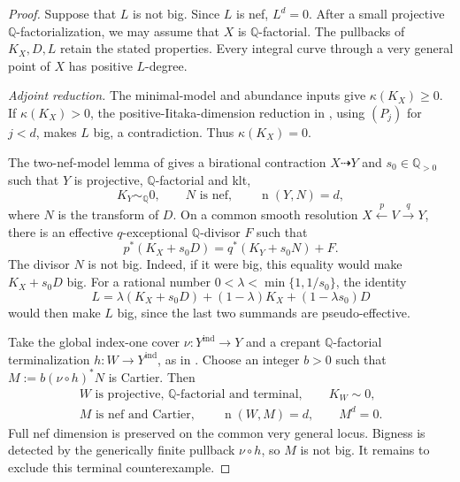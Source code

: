 \documentclass[12pt,a4paper,psamsfonts]{amsart}
\theoremstyle{definition}
\theoremstyle{plain}
\newcommand{\Q}{\mathbb Q}
\newcommand{\nef}{\operatorname{n}}
\begin{document}
\begin{proof}
Suppose that $L$ is not big. Since $L$ is nef, $L^d=0$.
After a small projective $\Q$-factorialization, we may assume
that $X$ is $\Q$-factorial. The pullbacks of $K_X,D,L$ retain
the stated properties. Every integral curve through a very
general point of $X$ has positive $L$-degree.

\medskip
\noindent\emph{Adjoint reduction.}
The minimal-model and abundance inputs give $\kappa(K_X)\ge0$.
If $\kappa(K_X)>0$, the positive-Iitaka-dimension reduction in
\cite[Section~3.3]{NS}, using $(P_j)$ for $j<d$, makes $L$ big,
a contradiction. Thus $\kappa(K_X)=0$.

The two-nef-model lemma of \cite[Section~3.2]{NS} gives a
birational contraction $X\dashrightarrow Y$ and $s_0\in\Q_{>0}$
such that $Y$ is projective, $\Q$-factorial and klt,
\[
 K_Y\sim_{\Q}0,\qquad
 N\text{ is nef},\qquad \nef(Y,N)=d,
\]
where $N$ is the transform of $D$. On a common smooth resolution
$X\xleftarrow{p}V\xrightarrow{q}Y$, there is an effective
$q$-exceptional $\Q$-divisor $F$ such that
\[
 p^*(K_X+s_0D)=q^*(K_Y+s_0N)+F.
\]
The divisor $N$ is not big. Indeed, if it were big, this equality
would make $K_X+s_0D$ big. For a rational number
$0<\lambda<\min\{1,1/s_0\}$, the identity
\[
 L=\lambda(K_X+s_0D)+(1-\lambda)K_X+(1-\lambda s_0)D
\]
would then make $L$ big, since the last two summands are
pseudo-effective.

Take the global index-one cover $\nu:Y^{\mathrm{ind}}\to Y$ and
a crepant $\Q$-factorial terminalization
$h:W\to Y^{\mathrm{ind}}$, as in \cite[Section~7]{NS}. Choose an
integer $b>0$ such that $M:=b(\nu\circ h)^*N$ is Cartier. Then
\[
 \begin{gathered}
 W\text{ is projective, $\Q$-factorial and terminal},\qquad
 K_W\sim0,\\
 M\text{ is nef and Cartier},\qquad
 \nef(W,M)=d,\qquad M^d=0.
 \end{gathered}
\]
Full nef dimension is preserved on the common very general
locus. Bigness is detected by the generically finite pullback
$\nu\circ h$, so $M$ is not big. It remains to exclude this
terminal counterexample.


\end{proof}
\end{document}

